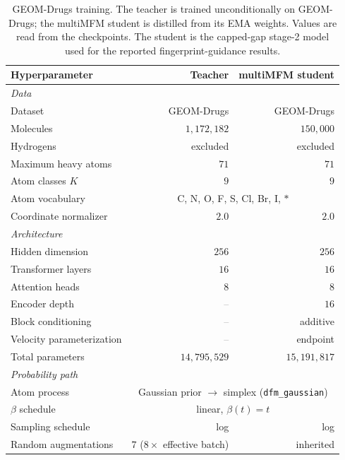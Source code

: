 \documentclass[11pt]{article}
\newcommand{\naa}{\textcolor{gray}{--}}
\begin{document}
\begin{table}[h]\centering
\caption{GEOM-Drugs training. The teacher is trained unconditionally on
GEOM-Drugs; the multiMFM student is distilled from its EMA weights. Values are
read from the checkpoints. The student is the capped-gap stage-2 model used for
the reported fingerprint-guidance results.}
\label{tab:geom-training}
\begin{tabular}{lrr}
\toprule
\textbf{Hyperparameter} & \textbf{Teacher} & \textbf{multiMFM student} \\
\midrule
\multicolumn{3}{l}{\emph{Data}} \\
Dataset                        & GEOM-Drugs & GEOM-Drugs \\
Molecules                      & $1{,}172{,}182$ & $150{,}000$ \\
Hydrogens                      & excluded & excluded \\
Maximum heavy atoms            & $71$ & $71$ \\
Atom classes $K$               & $9$ & $9$ \\
Atom vocabulary                & \multicolumn{2}{c}{C, N, O, F, S, Cl, Br, I, $*$} \\
Coordinate normalizer          & $2.0$ & $2.0$ \\
\midrule
\multicolumn{3}{l}{\emph{Architecture}} \\
Hidden dimension               & $256$ & $256$ \\
Transformer layers             & $16$  & $16$ \\
Attention heads                & $8$   & $8$ \\
Encoder depth                  & \naa  & $16$ \\
Block conditioning             & \naa  & additive \\
Velocity parameterization      & \naa  & endpoint \\
Total parameters               & $14{,}795{,}529$ & $15{,}191{,}817$ \\
\midrule
\multicolumn{3}{l}{\emph{Probability path}} \\
Atom process                   & \multicolumn{2}{c}{Gaussian prior $\to$ simplex (\texttt{dfm\_gaussian})} \\
$\beta$ schedule               & \multicolumn{2}{c}{linear, $\beta(t)=t$} \\
Sampling schedule              & log & log \\
Random augmentations           & $7$ ($8\times$ effective batch) & inherited \\

\end{tabular}
\end{table}
\end{document}
